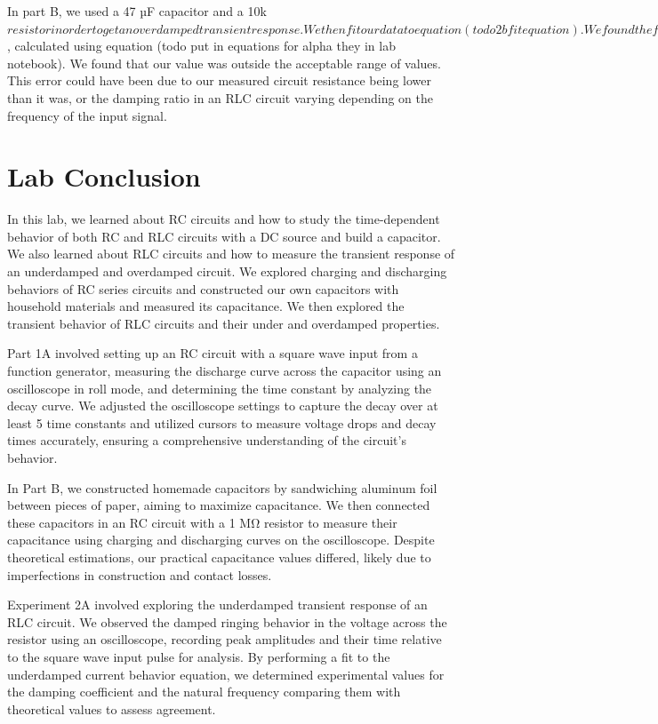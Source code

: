 \documentclass[11pt]{article}
\let\oldsection\section
\renewcommand\section{\clearpage\oldsection}
\begin{document}
    In part B, we used a 47 µF capacitor and a 10k \Omega$ resistor in order to get an overdamped transient response. We then fit our data to equation (todo 2b fit equation). We found the fit parameters A = 0.980 +/- 0.011 and D = 1518.932 +/- 30.657. We focused on our value for D, comparing it to the theoretical value for \alpha$, calculated using equation (todo put in equations for alpha they in lab notebook). We found that our value was outside the acceptable range of values. This error could have been due to our measured circuit resistance being lower than it was, or the damping ratio in an RLC circuit varying depending on the frequency of the input signal.

    \section{Lab Conclusion}\label{sec:conclusion}
    In this lab, we learned about RC circuits and how to study the time-dependent behavior of both RC and RLC circuits with a DC source and build a capacitor. We also learned about RLC circuits and how to measure the transient response of an underdamped and overdamped circuit. We explored charging and discharging behaviors of RC series circuits and constructed our own capacitors with household materials and measured its capacitance. We then explored the transient behavior of RLC circuits and their under and overdamped properties.

    Part 1A involved setting up an RC circuit with a square wave input from a function generator, measuring the discharge curve across the capacitor using an oscilloscope in roll mode, and determining the time constant by analyzing the decay curve. We adjusted the oscilloscope settings to capture the decay over at least 5 time constants and utilized cursors to measure voltage drops and decay times accurately, ensuring a comprehensive understanding of the circuit's behavior.

    In Part B, we constructed homemade capacitors by sandwiching aluminum foil between pieces of paper, aiming to maximize capacitance. We then connected these capacitors in an RC circuit with a 1 MΩ resistor to measure their capacitance using charging and discharging curves on the oscilloscope. Despite theoretical estimations, our practical capacitance values differed, likely due to imperfections in construction and contact losses.

    Experiment 2A involved exploring the underdamped transient response of an RLC circuit. We observed the damped ringing behavior in the voltage across the resistor using an oscilloscope, recording peak amplitudes and their time relative to the square wave input pulse for analysis. By performing a fit to the underdamped current behavior equation, we determined experimental values for the damping coefficient and the natural frequency comparing them with theoretical values to assess agreement.
\end{document}
